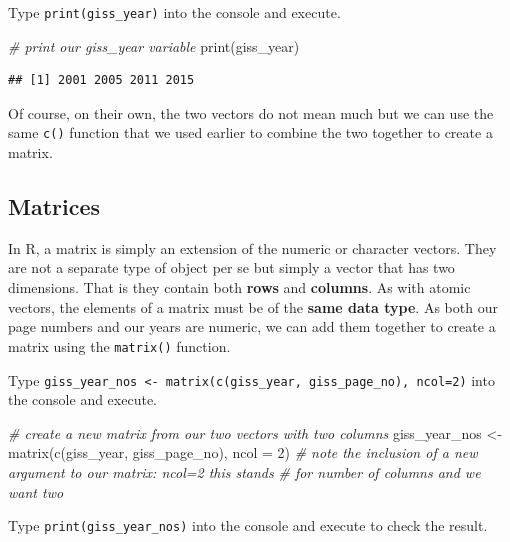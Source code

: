 \documentclass[
]{book}
\newenvironment{Shaded}{\begin{snugshade}}{\end{snugshade}}
\newcommand{\AttributeTok}[1]{\textcolor[rgb]{0.77,0.63,0.00}{#1}}
\newcommand{\CommentTok}[1]{\textcolor[rgb]{0.56,0.35,0.01}{\textit{#1}}}
\newcommand{\DecValTok}[1]{\textcolor[rgb]{0.00,0.00,0.81}{#1}}
\newcommand{\FunctionTok}[1]{\textcolor[rgb]{0.00,0.00,0.00}{#1}}
\newcommand{\NormalTok}[1]{#1}
\newcommand{\OtherTok}[1]{\textcolor[rgb]{0.56,0.35,0.01}{#1}}
\begin{document}
Type \texttt{print(giss\_year)} into the console and execute.

\begin{Shaded}
\begin{Highlighting}[]
\CommentTok{\# print our giss\_year variable}
\FunctionTok{print}\NormalTok{(giss\_year)}
\end{Highlighting}
\end{Shaded}

\begin{verbatim}
## [1] 2001 2005 2011 2015
\end{verbatim}

Of course, on their own, the two vectors do not mean much but we can use the same \texttt{c()} function that we used earlier to combine the two together to create a matrix.

\hypertarget{matrices}{%
\subsection{Matrices}\label{matrices}}

In R, a matrix is simply an extension of the numeric or character vectors. They are not a separate type of object per se but simply a vector that has two dimensions. That is they contain both \textbf{rows} and \textbf{columns}. As with atomic vectors, the elements of a matrix must be of the \textbf{same data type}. As both our page numbers and our years are numeric, we can add them together to create a matrix using the \texttt{matrix()} function.

Type \texttt{giss\_year\_nos\ \textless{}-\ matrix(c(giss\_year,\ giss\_page\_no),\ ncol=2)} into the console and execute.

\begin{Shaded}
\begin{Highlighting}[]
\CommentTok{\# create a new matrix from our two vectors with two columns}
\NormalTok{giss\_year\_nos }\OtherTok{\textless{}{-}} \FunctionTok{matrix}\NormalTok{(}\FunctionTok{c}\NormalTok{(giss\_year, giss\_page\_no), }\AttributeTok{ncol =} \DecValTok{2}\NormalTok{)}
\CommentTok{\# note the inclusion of a new argument to our matrix: ncol=2 this stands}
\CommentTok{\# for \textquotesingle{}number of columns\textquotesingle{} and we want two}
\end{Highlighting}
\end{Shaded}

Type \texttt{print(giss\_year\_nos)} into the console and execute to check the result.
\end{document}
